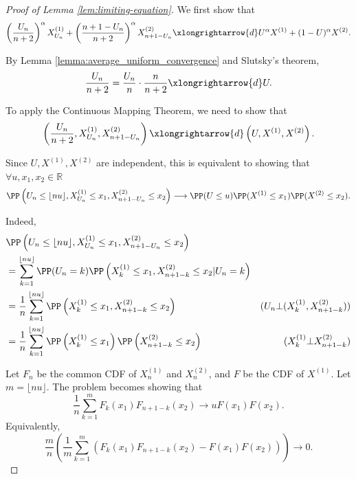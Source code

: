 \begin{proof}[Proof of Lemma \ref{lem:limiting-equation}]
  We first show that
  $$\left(\dfrac{U_n}{n+2}\right)^\alpha X_{U_n}^{(1)} + \left(\dfrac{n+1-U_n}{n+2}\right)^\alpha X_{n+1-U_n}^{(2)} \xlongrightarrow{d} U^\alpha X^{(1)} + (1-U)^\alpha X^{(2)}.$$

  By Lemma \ref{lemma:average_uniform_convergence} and Slutsky's theorem,
  $$\dfrac{U_n}{n+2} = \dfrac{U_n}{n} \cdot \dfrac{n}{n+2} \xlongrightarrow{d} U.$$

  To apply the Continuous Mapping Theorem, we need to show that
  $$\left(\dfrac{U_n}{n+2}, X_{U_n}^{(1)}, X_{n+1-U_n}^{(2)}\right) \xlongrightarrow{d} \left(U, X^{(1)}, X^{(2)}\right).$$

  Since $U, X^{(1)}, X^{(2)}$ are independent, this is equivalent to showing that $\forall u, x_1, x_2 \in \mathbb{R}$
  $$\PP\left(U_n \le \lfloor nu \rfloor, X_{U_n}^{(1)} \le x_1, X_{n+1-U_n}^{(2)} \le x_2\right) \longrightarrow \PP(U \le u) \PP(X^{(1)} \le x_1) \PP(X^{(2)} \le x_2).$$

  Indeed,
  \begin{align*}
     & \PP\left(U_n \le \lfloor nu \rfloor, X_{U_n}^{(1)} \le x_1, X_{n+1-U_n}^{(2)} \le x_2\right)                                                                         \\
     & = \sum_{k=1}^{\lfloor nu \rfloor} \PP(U_n=k) \PP\left(X_{k}^{(1)} \le x_1, X_{n+1-k}^{(2)} \le x_2 | U_n=k\right)                                                    \\
     & =  \dfrac{1}{n}\sum_{k=1}^{\lfloor nu \rfloor} \PP\left(X_{k}^{(1)} \le x_1, X_{n+1-k}^{(2)} \le x_2\right)               & (U_n\bot (X_{k}^{(1)}, X_{n+1-k}^{(2)})) \\
     & =  \dfrac{1}{n}\sum_{k=1}^{\lfloor nu \rfloor} \PP\left(X_{k}^{(1)} \le x_1\right)\PP\left(X_{n+1-k}^{(2)} \le x_2\right) & (X_{k}^{(1)} \bot X_{n+1-k}^{(2)})       \\
  \end{align*}

  Let $F_n$ be the common CDF of $X_n^{(1)}$ and $X_n^{(2)}$, and $F$ be the CDF of $X^{(1)}$. Let $m = \lfloor nu \rfloor$. The problem becomes showing that
  $$\dfrac{1}{n}\sum_{k=1}^{m} F_k(x_1)F_{n+1-k}(x_2) \longrightarrow u F(x_1) F(x_2).$$
  Equivalently,
  $$\dfrac{m}{n}\left(\dfrac{1}{m}\sum_{k=1}^{m} \left(F_k(x_1)F_{n+1-k}(x_2)-F(x_1) F(x_2)\right)\right) \longrightarrow 0.$$


\end{proof}
